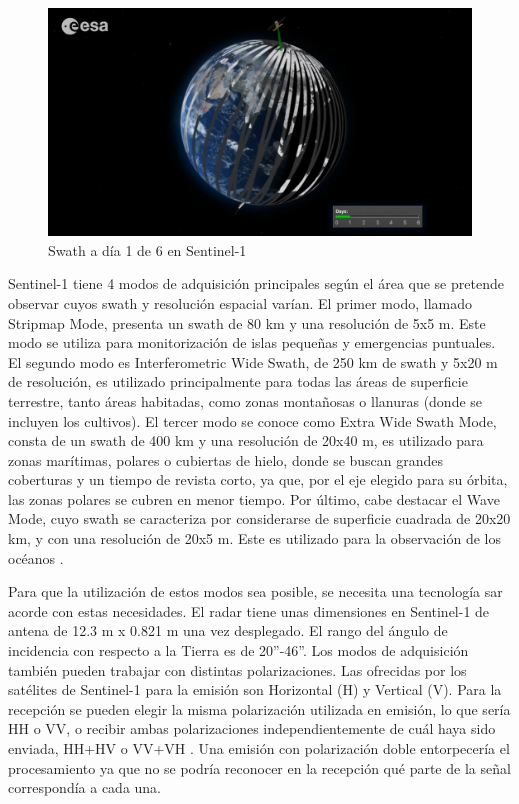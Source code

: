 \\
\begin{figure}[h]
    \centering
    \includegraphics[width=.9\linewidth]{archivos/tfg/swathS1} %
    \caption{Swath a día 1 de 6 en Sentinel-1 \cite{ESAcons}}
    \label{fig:swath}
\end{figure}
\par Sentinel-1 tiene 4 modos de adquisición principales según el área que se pretende observar cuyos swath y resolución espacial varían. El primer modo, llamado Stripmap Mode, presenta un swath de 80 km y una resolución de 5x5 m. Este modo se utiliza para monitorización de islas pequeñas y emergencias puntuales. El segundo modo es Interferometric Wide Swath, de 250 km de swath y 5x20 m de resolución, es utilizado principalmente para todas las áreas de superficie terrestre, tanto áreas habitadas, como zonas montañosas o llanuras (donde se incluyen los cultivos). El tercer modo se conoce como Extra Wide Swath Mode, consta de un swath de 400 km y una resolución de 20x40 m, es utilizado para zonas marítimas, polares o cubiertas de hielo, donde se buscan grandes coberturas y un tiempo de revista corto, ya que, por el eje elegido para su órbita, las zonas polares se cubren en menor tiempo. Por último, cabe destacar el Wave Mode, cuyo swath se caracteriza por considerarse de superficie cuadrada de 20x20 km, y con una resolución de 20x5 m. Este es utilizado para la observación de los océanos \cite{EOSs1}. 
\\
\par Para que la utilización de estos modos sea posible, se necesita una tecnología \gls{sar} acorde con estas necesidades. El radar tiene unas dimensiones en Sentinel-1 de antena de 12.3 m x 0.821 m una vez desplegado. El rango del ángulo de incidencia con respecto a la Tierra es de 20”-46”. Los modos de adquisición también pueden trabajar con distintas polarizaciones. Las ofrecidas por los satélites de Sentinel-1 para la emisión son Horizontal (H) y Vertical (V). Para la recepción se pueden elegir la misma polarización utilizada en emisión, lo que sería HH o VV, o recibir ambas polarizaciones independientemente de cuál haya sido enviada, HH+HV o VV+VH \cite{EOSs1}. Una emisión con polarización doble entorpecería el procesamiento ya que no se podría reconocer en la recepción qué parte de la señal correspondía a cada una. 


